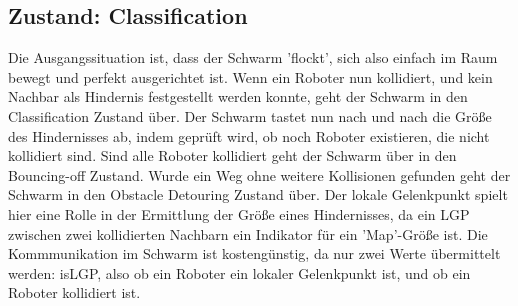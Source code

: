 \subsection{Zustand: Classification}

Die Ausgangssituation ist, dass der Schwarm 'flockt', sich also einfach im Raum bewegt und perfekt
ausgerichtet ist.
Wenn ein Roboter nun kollidiert, und kein Nachbar als Hindernis festgestellt werden konnte, geht der
Schwarm in den Classification Zustand über. Der Schwarm tastet nun nach und nach die Größe des Hindernisses
ab, indem geprüft wird, ob noch Roboter existieren, die nicht kollidiert sind. Sind alle Roboter kollidiert
geht der Schwarm über in den Bouncing-off Zustand. Wurde ein Weg ohne weitere Kollisionen gefunden geht
der Schwarm in den Obstacle Detouring Zustand über. Der lokale Gelenkpunkt spielt hier eine Rolle in der
Ermittlung der Größe eines Hindernisses, da ein LGP zwischen zwei kollidierten Nachbarn ein Indikator für
ein 'Map'-Größe ist. Die Kommmunikation im Schwarm ist kostengünstig, da nur zwei Werte übermittelt werden:
isLGP, also ob ein Roboter ein lokaler Gelenkpunkt ist, und ob ein Roboter kollidiert ist.
